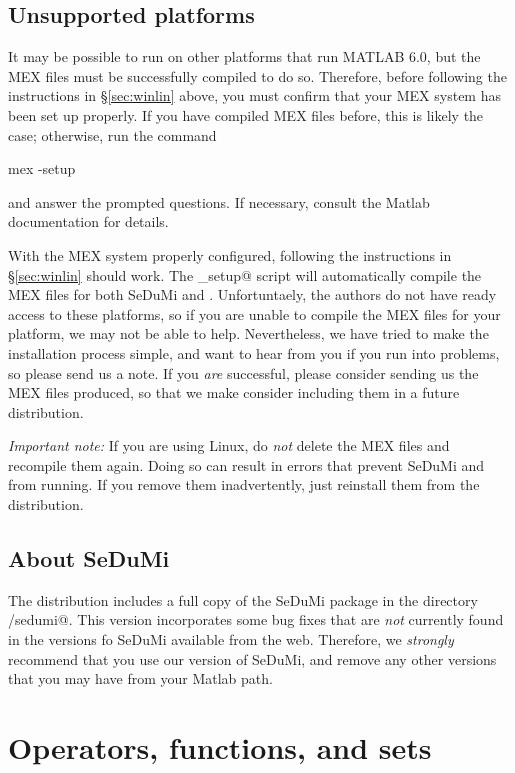 \documentclass[12pt]{article}
\begin{document}
\subsection{Unsupported platforms}
\label{sec:othersys}

It may be possible to run \cvx on other platforms that run MATLAB 6.0, 
but the MEX files must be successfully compiled to do so. Therefore, before
following the instructions in \S\ref{sec:winlin} above, you must
confirm that your MEX system has been set up properly. If you have compiled
MEX files before, this is likely the case; otherwise, run the command
\begin{code}
	mex -setup
\end{code}
and answer the prompted questions. If necessary, consult the Matlab documentation for details.

With the MEX system properly configured, following the instructions in
\S\ref{sec:winlin} should work. The \verb@cvx_setup@ script will automatically
compile the MEX files for both SeDuMi and \cvx. Unfortuntaely, the authors do not have ready access to these platforms, so if you
are unable to compile the MEX files for your platform, we may not be able to help.
Nevertheless, we have tried to make the installation process simple, and 
want to hear from you if you run into problems, so please send us a note. If
you \emph{are} successful, please consider sending us the MEX files produced,
so that we make consider including them in a future \cvx distribution.

\emph{Important note:} If you are using Linux,
do \emph{not} delete the MEX files and recompile them again.
Doing so can result in  errors that prevent SeDuMi and \cvx from running.
If you remove them inadvertently, just reinstall them from the distribution.

\subsection{About SeDuMi}

The \cvx distribution includes a full copy of the SeDuMi package
in the directory \verb@cvx/sedumi@. This version incorporates 
some bug fixes that are \emph{not} currently found in the versions fo SeDuMi
available from the web. Therefore, we \emph{strongly} recommend that
you use our version of SeDuMi, and remove any other versions that 
you may have from your Matlab path.

\section{Operators, functions, and sets}
\label{s-functions}
\end{document}
